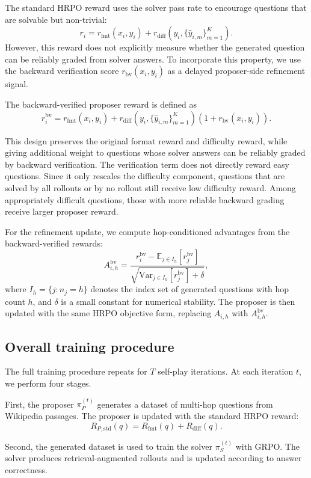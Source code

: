 \documentclass{article}
\begin{document}
The standard HRPO reward uses the solver pass rate to encourage questions that
are solvable but non-trivial:
\[
r_i
=
r_{\mathrm{fmt}}(x_i,y_i)
+
r_{\mathrm{diff}}(y_i,\{\hat{y}_{i,m}\}_{m=1}^{K}).
\]
However, this reward does not explicitly measure whether the generated question
can be reliably graded from solver answers. To incorporate this property, we
use the backward verification score $r_{\mathrm{bv}}(x_i,y_i)$ as a delayed
proposer-side refinement signal.

The backward-verified proposer reward is defined as
\[
r_i^{\mathrm{bv}}
=
r_{\mathrm{fmt}}(x_i,y_i)
+
r_{\mathrm{diff}}(y_i,\{\hat{y}_{i,m}\}_{m=1}^{K})
\left(
1+r_{\mathrm{bv}}(x_i,y_i)
\right).
\]

This design preserves the original format reward and difficulty reward, while
giving additional weight to questions whose solver answers can be reliably
graded by backward verification. The verification term does not directly
reward easy questions. Since it only rescales the difficulty component,
questions that are solved by all rollouts or by no rollout still receive low
difficulty reward. Among appropriately difficult questions, those with more
reliable backward grading receive larger proposer reward.

For the refinement update, we compute hop-conditioned advantages from the
backward-verified rewards:
\[
A_{i,h}^{\mathrm{bv}}
=
\frac{
r_i^{\mathrm{bv}} - \mathbb{E}_{j\in I_h}[r_j^{\mathrm{bv}}]
}{
\sqrt{\mathrm{Var}_{j\in I_h}[r_j^{\mathrm{bv}}] + \delta}
},
\]
where $I_h = \{j : n_j = h\}$ denotes the index set of generated questions
with hop count $h$, and $\delta$ is a small constant for numerical stability.
The proposer is then updated with the same HRPO objective form, replacing
$A_{i,h}$ with $A_{i,h}^{\mathrm{bv}}$.

\subsection{Overall training procedure}

The full training procedure repeats for $T$ self-play iterations. At each iteration $t$, we perform four stages.

First, the proposer $\pi_P^{(t)}$ generates a dataset of multi-hop questions from Wikipedia passages. The proposer is updated with the standard HRPO reward:
\[
R_{P,\mathrm{std}}(q)
=
R_{\mathrm{fmt}}(q)
+
R_{\mathrm{diff}}(q).
\]

Second, the generated dataset is used to train the solver $\pi_S^{(t)}$ with GRPO. The solver produces retrieval-augmented rollouts and is updated according to answer correctness.
\end{document}
